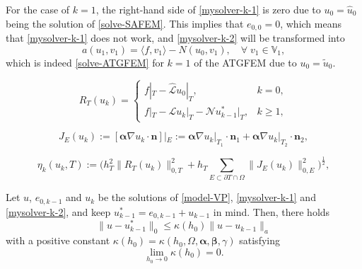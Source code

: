 \documentclass[10pt,a4paper]{amsart}
\newcommand{\Ltw}[1]{\|#1\|_0}
\newcommand{\LtwE}[1]{\|#1\|_{0,E}}
\newcommand{\anorm}[1]{\|#1\|_a}
\def\geq{\geqslant}
\newcommand{\hmcL}{\hat{\mathcal{L}}}
\newcommand{\hu}{\hat{u}}
\def\leq{\leqslant}
\newcommand{\mbV}{\mathbb{V}}
\newcommand{\mcL}{\mathcal{L}}
\newcommand{\mcN}{\mathcal{N}}
\newcommand{\tu}{\tilde{u}}
\newcommand{\valpha}{\boldsymbol{\alpha}}
\newcommand{\vbeta}{\boldsymbol{\beta}}
\newcommand{\vect}[1]{\boldsymbol{#1}}
\begin{document}
\begin{remark}\label{rem-CATG-1}For the case of $k = 1$, the right-hand side of \eqref{mysolver-k-1} is zero due to $u_0 = \hu_0$ being the solution of \eqref{solve-SAFEM}. This implies that $e_{0,0} = 0$, which means that \eqref{mysolver-k-1} does not work, and \eqref{mysolver-k-2} will be transformed into 
\begin{equation}\label{solve-CATGFEM-1}
	a(u_1,v_1) = \langle f, v_1 \rangle - N(u_0,v_1), \quad \forall \; v_1 \in \mbV_1, 
\end{equation}
which is indeed \eqref{solve-ATGFEM} for $k=1$ of the ATGFEM due to $u_0 = \tu_0$.  
\end{remark}

\begin{equation}\label{def-residual}
	R_T(u_k) = \begin{cases}
		f|_T - \hmcL u_0 |_T, & k = 0, \\
		f|_T - \mcL u_k|_T - \mcN u_{k-1}^* |_T, & k \geq 1, 
	\end{cases}
\end{equation}

\begin{equation}\label{jump}
	J_E(u_k) := [\valpha \nabla u_k \cdot \vect{n}]|_E := \valpha\nabla u_k|_{T_1} \cdot \vect{n}_1 + \valpha \nabla u_k |_{T_2} \cdot \vect{n}_2,
\end{equation}

\begin{equation}\label{eta-T}
	\eta_k(u_k,T) := \Big(h_T^2 \|R_T(u_k)\|_{0,T}^2 + h_T 
	\sum_{E \subset \partial T \cap \Omega}\LtwE{J_E(u_k)}^2\Big)^\frac{1}{2}, 
\end{equation}	

\begin{lemma}\label{lem-L2-lifting}
	Let $u$, $e_{0,k-1}$ and $u_k$ be the solutions of \eqref{model-VP}, \eqref{mysolver-k-1} and \eqref{mysolver-k-2}, and keep $u_{k-1}^*=e_{0,k-1} + u_{k-1}$ in mind. Then, there holds 
		\begin{equation}\label{result-L2-lifting}
			\Ltw{u-u_{k-1}^*} \leq \kappa(h_0) \anorm{u-u_{k-1}}
		\end{equation}
with a positive constant $\kappa(h_0) = \kappa(h_0,\Omega,\valpha,\vbeta,\gamma)$ satisfying
		\begin{equation}\label{property-kappaH}
			\lim_{h_0 \rightarrow 0} \kappa(h_0) = 0.  
		\end{equation}
\end{lemma}
\end{document}
